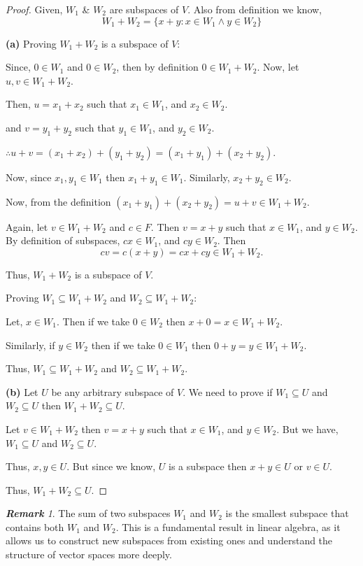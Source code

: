 \documentclass[12pt, a4paper]{article}
\theoremstyle{definition}
\theoremstyle{remark}
\newtheorem*{remark}{\textbf{Remark}}
\theoremstyle{solution}
\begin{document}
\begin{proof}
    Given, $W_1$ \& $W_2$ are subspaces of $V$. Also from definition we know, 
\[ W_1+W_2 = \{x+y : x \in W_1 \land y \in W_2\} \]

\textbf{(a)} Proving $W_1+W_2$ is a subspace of $V$:

Since, $0 \in W_1$ and $0 \in W_2$, then by definition $0 \in W_1+W_2$. Now, let $u, v \in W_1+W_2$.

Then, $u = x_1+x_2$ such that $x_1 \in W_1$, and $x_2 \in W_2$.

and $v = y_1+y_2$ such that $y_1 \in W_1$, and $y_2 \in W_2$.

$\therefore u+v = (x_1+x_2) + (y_1+y_2) = (x_1+y_1) + (x_2+y_2)$.

Now, since $x_1, y_1 \in W_1$ then $x_1+y_1 \in W_1$. Similarly, $x_2+y_2 \in W_2$.

Now, from the definition $(x_1+y_1) + (x_2+y_2) = u+v \in W_1+W_2$.

Again, let $v \in W_1+W_2$ and $c \in F$. Then $v = x+y$ such that $x \in W_1$, and $y \in W_2$. By definition of subspaces, $cx \in W_1$, and $cy \in W_2$. Then 
\[ cv = c(x+y) = cx+cy \in W_1+W_2. \]

Thus, $W_1+W_2$ is a subspace of $V$.

Proving $W_1 \subseteq W_1+W_2$ and $W_2 \subseteq W_1+W_2$:

Let, $x \in W_1$. Then if we take $0 \in W_2$ then $x+0 = x \in W_1+W_2$.

Similarly, if $y \in W_2$ then if we take $0 \in W_1$ then $0+y = y \in W_1+W_2$.

Thus, $W_1 \subseteq W_1+W_2$ and $W_2 \subseteq W_1+W_2$.

\vspace{0.5cm}

\textbf{(b)} Let $U$ be any arbitrary subspace of $V$. We need to prove if $W_1 \subseteq U$ and $W_2 \subseteq U$ then $W_1+W_2 \subseteq U$.

Let $v \in W_1+W_2$ then $v = x+y$ such that $x \in W_1$, and $y \in W_2$. But we have, $W_1 \subseteq U$ and $W_2 \subseteq U$.

Thus, $x, y \in U$. But since we know, $U$ is a subspace then $x+y \in U$ or $v \in U$.

Thus, $W_1+W_2 \subseteq U$.
\end{proof}

\begin{remark}
    The sum of two subspaces $W_1$ and $W_2$ is the smallest subspace that contains both $W_1$ and $W_2$. This is a fundamental result in linear algebra, as it allows us to construct new subspaces from existing ones and understand the structure of vector spaces more deeply.
\end{remark}
\end{document}
